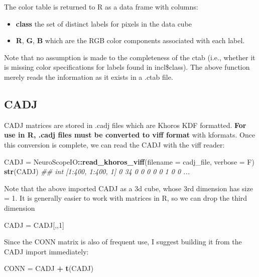 \documentclass[]{article}
\newenvironment{Shaded}{\begin{snugshade}}{\end{snugshade}}
\newcommand{\CommentTok}[1]{\textcolor[rgb]{0.56,0.35,0.01}{\textit{#1}}}
\newcommand{\DataTypeTok}[1]{\textcolor[rgb]{0.13,0.29,0.53}{#1}}
\newcommand{\DecValTok}[1]{\textcolor[rgb]{0.00,0.00,0.81}{#1}}
\newcommand{\KeywordTok}[1]{\textcolor[rgb]{0.13,0.29,0.53}{\textbf{#1}}}
\newcommand{\NormalTok}[1]{#1}
\newcommand{\OperatorTok}[1]{\textcolor[rgb]{0.81,0.36,0.00}{\textbf{#1}}}
\newcommand{\StringTok}[1]{\textcolor[rgb]{0.31,0.60,0.02}{#1}}
\providecommand{\tightlist}{%
  \setlength{\itemsep}{0pt}\setlength{\parskip}{0pt}}
\begin{document}
The color table is returned to R as a data frame with columns:

\begin{itemize}
\tightlist
\item
  \textbf{class} the set of distinct labels for pixels in the data cube
\item
  \textbf{R}, \textbf{G}, \textbf{B} which are the RGB color components associated with each label.
\end{itemize}

Note that no assumption is made to the completeness of the ctab (i.e., whether it is missing color specifications for labels found in incl\$class). The above function merely reads the information as it exists in a .ctab file.

\hypertarget{cadj}{%
\subsection{CADJ}\label{cadj}}

CADJ matrices are stored in .cadj files which are Khoros KDF formatted. \textbf{For use in R, .cadj files must be converted to viff format} with kformats. Once this conversion is complete, we can read the CADJ with the viff reader:

\begin{Shaded}
\begin{Highlighting}[]
\NormalTok{CADJ =}\StringTok{ }\NormalTok{NeuroScopeIO}\OperatorTok{::}\KeywordTok{read_khoros_viff}\NormalTok{(}\DataTypeTok{filename =}\NormalTok{ cadj_file, }\DataTypeTok{verbose =}\NormalTok{ F)}
\KeywordTok{str}\NormalTok{(CADJ)}
\CommentTok{##  int [1:400, 1:400, 1] 0 34 0 0 0 0 0 1 0 0 ...}
\end{Highlighting}
\end{Shaded}

Note that the above imported CADJ as a 3d cube, whose 3rd dimension has size = 1. It is generally easier to work with matrices in R, so we can drop the third dimension

\begin{Shaded}
\begin{Highlighting}[]
\NormalTok{CADJ =}\StringTok{ }\NormalTok{CADJ[,,}\DecValTok{1}\NormalTok{]}
\end{Highlighting}
\end{Shaded}

Since the CONN matrix is also of frequent use, I suggest building it from the CADJ import immediately:

\begin{Shaded}
\begin{Highlighting}[]
\NormalTok{CONN =}\StringTok{ }\NormalTok{CADJ }\OperatorTok{+}\StringTok{ }\KeywordTok{t}\NormalTok{(CADJ)}
\end{Highlighting}
\end{Shaded}
\end{document}
